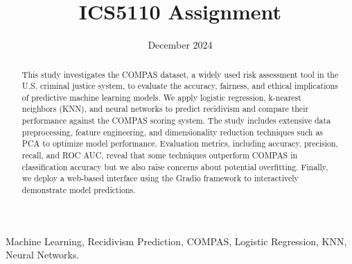 \documentclass[conference]{IEEEtran}
\begin{document}
	
	\title{ICS5110 Assignment}
	
	\author{
		\date{December 2024}
		
	}
	
	\maketitle
	
	\begin{abstract}
	This study investigates the COMPAS dataset, a widely used risk assessment tool in the U.S. criminal justice system, to evaluate the accuracy, fairness, and ethical implications of predictive machine learning models. We apply logistic regression, k-nearest neighbors (KNN), and neural networks to predict recidivism and compare their performance against the COMPAS scoring system. The study includes extensive data preprocessing, feature engineering, and dimensionality reduction techniques such as PCA to optimize model performance. Evaluation metrics, including accuracy, precision, recall, and ROC AUC, reveal that some techniques outperform COMPAS in classification accuracy but we also raise concerns about potential overfitting. Finally, we deploy a web-based interface using the Gradio framework to interactively demonstrate model predictions. 
	\end{abstract}
	
	\begin{IEEEkeywords}
		 Machine Learning, Recidivism Prediction, COMPAS, Logistic Regression, KNN, Neural Networks.
	\end{IEEEkeywords}
	
	
	
%	
	
%	
	
%	
	
	
	
	
	
	
	
	
	\printbibliography
	
\end{document}
